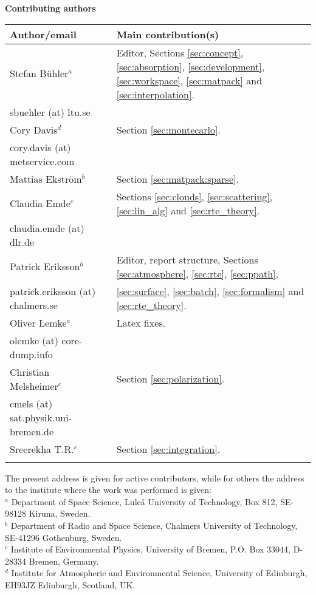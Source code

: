 %
\newpage
\thispagestyle{plain}
%
\begin{center}
  {\Large \bf Contributing authors}
\end{center}
\vspace*{10mm}
\begin{tabular}{lp{10mm}l}
  \hline
  {\bf Author/email} & & {\bf Main contribution(s)} \\
  \hline
  Stefan B\"uhler$^a$ & & Editor, Sections \ref{sec:concept},  
  \ref{sec:absorption}, \ref{sec:development}, \ref{sec:workspace},
  \ref{sec:matpack} and \ref{sec:interpolation}.\\
  sbuehler (at) ltu.se & &        \\
  \hline
  Cory Davis$^d$ & & Section \ref{sec:montecarlo}. \\
  cory.davis (at) metservice.com & & \\
  \hline
  Mattias Ekstr\"om$^b$ & & Section \ref{sec:matpack:sparse}. \\
  \hline
  Claudia Emde$^c$ & & Sections \ref{sec:clouds}, \ref{sec:scattering},
  \ref{sec:lin_alg} and \ref{sec:rte_theory}.\\
  claudia.emde (at) dlr.de & & \\
  \hline
  Patrick Eriksson$^b$ &  & Editor, report structure, 
  Sections \ref{sec:atmosphere}, \ref{sec:rte}, \ref{sec:ppath}, \\
  patrick.eriksson (at) chalmers.se & & 
  \ref{sec:surface}, \ref{sec:batch}, \ref{sec:formalism} and 
  \ref{sec:rte_theory}.\\
  \hline
  Oliver Lemke$^a$ & & Latex fixes.\\
  olemke (at) core-dump.info & & \\
  \hline
  Christian Melsheimer$^c$ & & Section \ref{sec:polarization}.\\
  cmels (at) sat.physik.uni-bremen.de & & \\
  \hline
  Sreerekha T.R.$^c$ & & Section \ref{sec:integration}.\\
  \hline
  &&\\
\end{tabular}

\noindent
The present address is given for active contributors, while for others
the address to the institute where the work was performed is given:\\
$^a$ Department of Space Science, Lule{\aa} University of Technology, 
Box 812, SE-98128 Kiruna, Sweden. \\
$^b$ Department of Radio and Space Science, Chalmers University of Technology,
SE-41296 Gothenburg, Sweden. \\
$^c$ Institute of Environmental Physics, University of Bremen, P.O. Box 33044, 
D-28334 Bremen, Germany. \\
$^d$ Institute for Atmospheric and Environmental Science, University of 
Edinburgh, EH93JZ Edinburgh, Scotland, UK. \\


